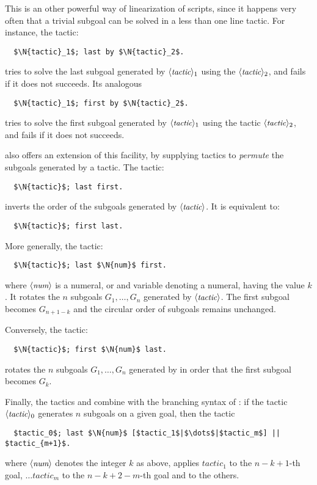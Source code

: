 This is an other powerful way of linearization of scripts, since it
happens very often that a trivial subgoal can be solved in a less than
one line tactic. For instance, the tactic:
\begin{lstlisting}
  $\N{tactic}_1$; last by $\N{tactic}_2$.
\end{lstlisting}
tries to solve the last subgoal generated by $\langle\mbox{\itshape\rmfamily\small tactic}\rangle_1$ using the
$\langle\mbox{\itshape\rmfamily\small tactic}\rangle_2$, and fails if it does not succeeds. Its analogous
\begin{lstlisting}
  $\N{tactic}_1$; first by $\N{tactic}_2$.
\end{lstlisting}
tries to solve the first subgoal generated by $\langle\mbox{\itshape\rmfamily\small tactic}\rangle_1$ using the
tactic $\langle\mbox{\itshape\rmfamily\small tactic}\rangle_2$, and fails if it does not succeeds.


\ssr{} also offers an extension of this facility, by supplying
tactics to \emph{permute}  the subgoals generated by a tactic.
The tactic:
\begin{lstlisting}
  $\N{tactic}$; last first.
\end{lstlisting}
inverts the order of the subgoals generated by $\langle\mbox{\itshape\rmfamily\small tactic}\rangle$. It is
equivalent to:
\begin{lstlisting}
  $\N{tactic}$; first last.
\end{lstlisting}

More generally, the tactic:
\begin{lstlisting}
  $\N{tactic}$; last $\N{num}$ first.
\end{lstlisting}
where $\langle\mbox{\itshape\rmfamily\small num}\rangle$ is
a \Coq{} numeral, or and \Ltac{} variable denoting
a \Coq{} numeral, having the value $k$. It
rotates the $n$ subgoals $G_1,
\dots, G_n$ generated by $\langle\mbox{\itshape\rmfamily\small tactic}\rangle$. The first subgoal becomes
$G_{n + 1 - k}$ and the circular order of subgoals remains unchanged.

Conversely, the tactic:
\begin{lstlisting}
  $\N{tactic}$; first $\N{num}$ last.
\end{lstlisting}
rotates the $n$ subgoals $G_1,
\dots, G_n$ generated by  in order that the first subgoal
becomes $G_{k}$.

Finally, the tactics  and  combine with the
branching syntax of \Ltac{}:
if the tactic $\langle\mbox{\itshape\rmfamily\small tactic}\rangle_0$ generates $n$
subgoals on a given goal, then the tactic
\begin{lstlisting}
  $tactic_0$; last $\N{num}$ [$tactic_1$|$\dots$|$tactic_m$] || $tactic_{m+1}$.
\end{lstlisting}
where $\langle\mbox{\itshape\rmfamily\small num}\rangle$ denotes the integer $k$ as above, applies $tactic_1$ to the
$n -k + 1$-th goal, $\dots tactic_m$ to the $n -k + 2 - m$-th
goal and  to the others.

